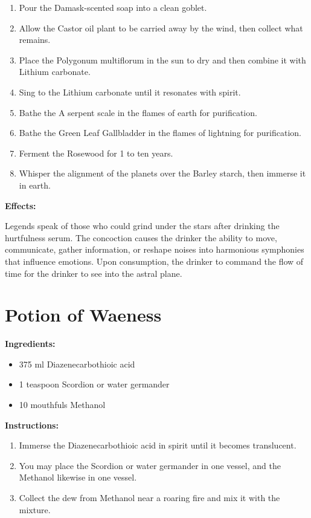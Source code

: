 \documentclass{article}
\begin{document}
\begin{enumerate}
  \item Pour the Damask-scented soap into a clean goblet.
  \item Allow the Castor oil plant to be carried away by the wind, then collect what remains.
  \item Place the Polygonum multiflorum in the sun to dry and then combine it with Lithium carbonate.
  \item Sing to the Lithium carbonate until it resonates with spirit.
  \item Bathe the A serpent scale in the flames of earth for purification.
  \item Bathe the Green Leaf Gallbladder in the flames of lightning for purification.
  \item Ferment the Rosewood for 1 to ten years.
  \item Whisper the alignment of the planets over the Barley starch, then immerse it in earth.
\end{enumerate}

\textbf{Effects:}

Legends speak of those who could grind under the stars after drinking the hurtfulness serum. The concoction causes the drinker the ability to move, communicate, gather information, or reshape noises into harmonious symphonies that influence emotions. Upon consumption, the drinker to command the flow of time for the drinker to see into the astral plane.

\newpage
\section*{Potion of Waeness}

\textbf{Ingredients:}

\begin{itemize}
  \item 375 ml Diazenecarbothioic acid
  \item 1 teaspoon Scordion or water germander
  \item 10 mouthfuls Methanol
\end{itemize}

\textbf{Instructions:}

\begin{enumerate}
  \item Immerse the Diazenecarbothioic acid in spirit until it becomes translucent.
  \item You may place the Scordion or water germander in one vessel, and the Methanol likewise in one vessel.
  \item Collect the dew from Methanol near a roaring fire and mix it with the mixture.
\end{enumerate}
\end{document}
